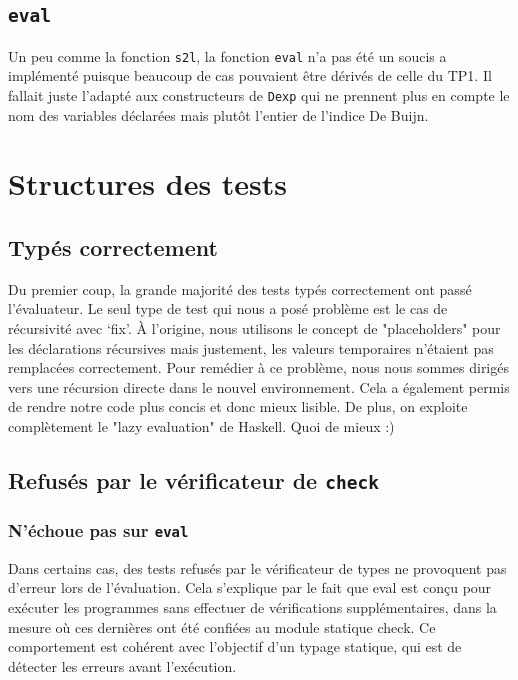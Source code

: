 \documentclass[a4paper,12pt]{article}
\begin{document}
    \subsection{\texttt{eval}}
        Un peu comme la fonction \texttt{s2l}, la fonction \texttt{eval} n'a pas été un soucis
        a implémenté puisque beaucoup de cas pouvaient être dérivés de celle du TP1. Il fallait 
        juste l'adapté aux constructeurs de \texttt{Dexp} qui ne prennent plus en compte le
        nom des variables déclarées mais plutôt l'entier de l'indice De Buijn.

\section{Structures des tests}
    \subsection{Typés correctement}
        Du premier coup, la grande majorité des tests typés correctement
        ont passé l'évaluateur. Le seul type de test qui nous a posé
        problème est le cas de récursivité avec `fix'. À l'origine,
        nous utilisons le concept de "placeholders" pour les déclarations
        récursives mais justement, les valeurs temporaires n'étaient pas
        remplacées correctement. Pour remédier à ce problème, nous nous
        sommes dirigés vers une récursion directe dans le nouvel environnement.
        Cela a également permis de rendre notre code plus concis et donc
        mieux lisible. De plus, on exploite complètement le "lazy evaluation"
        de Haskell. Quoi de mieux :)
    \subsection{Refusés par le vérificateur de \texttt{check}}
        \subsubsection{N'échoue pas sur \texttt{eval}}
        Dans certains cas, des tests refusés par le vérificateur de types ne provoquent pas d'erreur 
        lors de l'évaluation. Cela s'explique par le fait que eval est conçu pour exécuter les programmes 
        sans effectuer de vérifications supplémentaires, dans la mesure où ces dernières ont été confiées 
        au module statique check. Ce comportement est cohérent avec l'objectif d'un typage statique, qui est de 
        détecter les erreurs avant l'exécution. \\
\end{document}
